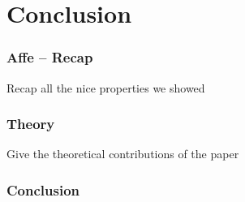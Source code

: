 \documentclass[aspectratio=169,dvipsnames,svgnames,10pt]{beamer}
\begin{document}
\section*{Conclusion}

\begin{frame}
  \frametitle{Affe -- Recap}
  Recap all the nice properties we showed
\end{frame}

\begin{frame}
  \frametitle{Theory}
  Give the theoretical contributions of the paper
\end{frame}

\begin{frame}
  \frametitle{Conclusion}
  
\end{frame}


\end{document}
